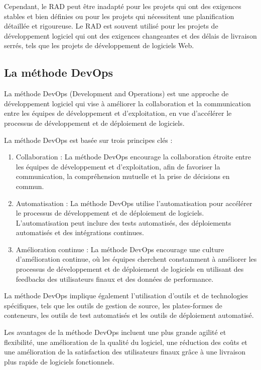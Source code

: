 Cependant, le RAD peut être inadapté pour les projets qui ont des exigences stables et bien définies ou pour les projets qui nécessitent une planification détaillée et rigoureuse. Le RAD est souvent utilisé pour les projets de développement logiciel qui ont des exigences changeantes et des délais de livraison serrés, tels que les projets de développement de logiciels Web.

\subsection{La méthode DevOps}\label{subsec:methode-devops}
La méthode DevOps (Development and Operations) est une approche de développement logiciel qui vise à améliorer la collaboration et la communication entre les équipes de développement et d'exploitation, en vue d'accélérer le processus de développement et de déploiement de logiciels.

La méthode DevOps est basée sur trois principes clés :
\begin{enumerate}
    \item Collaboration : La méthode DevOps encourage la collaboration étroite entre les équipes de développement et d'exploitation, afin de favoriser la communication, la compréhension mutuelle et la prise de décisions en commun.
    \item Automatisation : La méthode DevOps utilise l'automatisation pour accélérer le processus de développement et de déploiement de logiciels. L'automatisation peut inclure des tests automatisés, des déploiements automatisés et des intégrations continues.
    \item Amélioration continue : La méthode DevOps encourage une culture d'amélioration continue, où les équipes cherchent constamment à améliorer les processus de développement et de déploiement de logiciels en utilisant des feedbacks des utilisateurs finaux et des données de performance.
\end{enumerate}

La méthode DevOps implique également l'utilisation d'outils et de technologies spécifiques, tels que les outils de gestion de source, les plates-formes de conteneurs, les outils de test automatisés et les outils de déploiement automatisé.

Les avantages de la méthode DevOps incluent une plus grande agilité et flexibilité, une amélioration de la qualité du logiciel, une réduction des coûts et une amélioration de la satisfaction des utilisateurs finaux grâce à une livraison plus rapide de logiciels fonctionnels.

